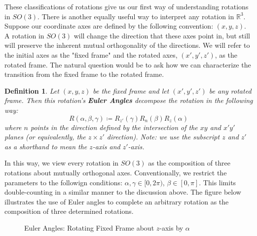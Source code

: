 \documentclass[10pt]{ucthesis}
\newcommand{\R}{\mathbb{R}}
\newtheorem{definition}{Definition}[chapter]
\begin{document}
These classifications of rotations give us our first way of understanding rotations in $SO(3)$. There is another equally useful way to interpret any rotation in $\R^3$. Suppose our coordinate axes are defined by the following convention: $(x,y,z)$. A rotation in $SO(3)$ will change the direction that these axes point in, but still will preserve the inherent mutual orthogonality of the directions. We will refer to the initial axes as the "fixed frame" and the rotated axes, $(x',y',z')$, as the rotated frame. The natural question would be to ask how we can characterize the transition from the fixed frame to the rotated frame.

\begin{definition}
	Let $(x,y,z)$ be the fixed frame and let $(x',y',z')$ be any rotated frame. Then this rotation's \textbf{Euler Angles} decompose the rotation in the following way:
$$R(\alpha,\beta,\gamma) \coloneq R_{z'}(\gamma)R_n(\beta)R_z(\alpha)$$
where $n$ points in the direction defined by the intersection of the $xy$ and $x'y'$ planes (or equivalently, the $z\times z'$ direction). Note: we use the subscript $z$ and $z'$ as a shorthand to mean the $z$-axis and $z'$-axis.
\end{definition}

In this way, we view every rotation in $SO(3)$ as the composition of three rotations about mutually orthogonal axes. Conventionally, we restrict the parameters to the followign conditions: $\alpha,\gamma\in[0,2\pi)$, $\beta\in[0,\pi]$. This limits double-counting in a similar manner to the discussion above. The figure below illustrates the use of Euler angles to complete an arbitrary rotation as the composition of three determined rotations.\\

\begin{figure}[H]
	\centering
	\caption{Euler Angles: Rotating Fixed Frame about $z$-axis by $\alpha$}
		
\end{figure}
\end{document}

